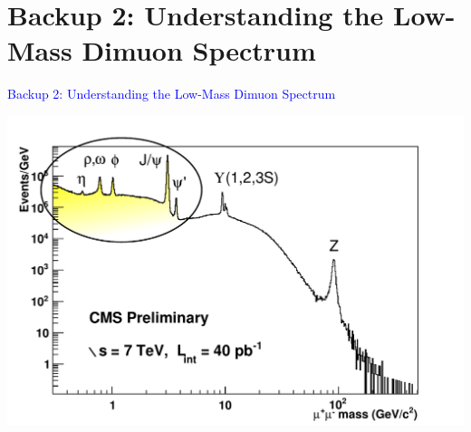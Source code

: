 \documentclass[compress]{beamer}
\begin{document}
\section*{Backup 2: Understanding the Low-Mass Dimuon Spectrum}
\begin{frame}
\vspace{0.75 cm}
\begin{center}
\Huge \textcolor{blue}{Backup 2: Understanding the Low-Mass Dimuon Spectrum}

\vspace{0.25 cm}
\includegraphics[width=0.75\linewidth]{dimuonSpectrum_40pb-1.pdf}
\end{center}
\end{frame}
\end{document}
